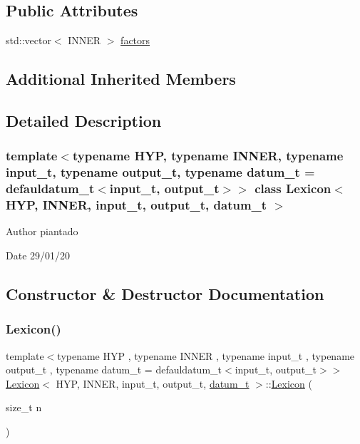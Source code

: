 \subsection*{Public Attributes}
\begin{DoxyCompactItemize}
\item 
std\+::vector$<$ I\+N\+N\+ER $>$ \hyperlink{class_lexicon_ac70865eb23b1e23f53f21e1760adac00}{factors}
\end{DoxyCompactItemize}
\subsection*{Additional Inherited Members}


\subsection{Detailed Description}
\subsubsection*{template$<$typename H\+YP, typename I\+N\+N\+ER, typename input\+\_\+t, typename output\+\_\+t, typename datum\+\_\+t = defauldatum\+\_\+t$<$input\+\_\+t, output\+\_\+t$>$$>$\newline
class Lexicon$<$ H\+Y\+P, I\+N\+N\+E\+R, input\+\_\+t, output\+\_\+t, datum\+\_\+t $>$}

\begin{DoxyAuthor}{Author}
piantado 
\end{DoxyAuthor}
\begin{DoxyDate}{Date}
29/01/20 
\end{DoxyDate}


\subsection{Constructor \& Destructor Documentation}
\mbox{\label{class_lexicon_a06bafc4711d145a026fe03e9e1168ae8}} 
\subsubsection{\texorpdfstring{Lexicon()}{Lexicon()}\hspace{0.1cm}{\footnotesize\ttfamily [1/2]}}
{\footnotesize\ttfamily template$<$typename H\+YP , typename I\+N\+N\+ER , typename input\+\_\+t , typename output\+\_\+t , typename datum\+\_\+t  = defauldatum\+\_\+t$<$input\+\_\+t, output\+\_\+t$>$$>$ \\
\hyperlink{class_lexicon}{Lexicon}$<$ H\+YP, I\+N\+N\+ER, input\+\_\+t, output\+\_\+t, \hyperlink{class_bayesable_a9f1a6c0cd7855550fa10b1a8f13a5867}{datum\+\_\+t} $>$\+::\hyperlink{class_lexicon}{Lexicon} (\begin{DoxyParamCaption}\item[{size\+\_\+t}]{n }\end{DoxyParamCaption})\hspace{0.3cm}{\ttfamily [inline]}}

